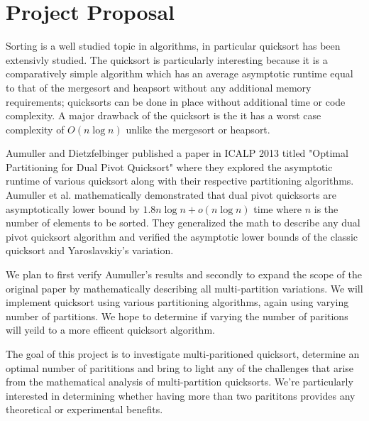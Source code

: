 \documentclass[12pt]{report}
\begin{document}
	\section{Project Proposal}
	
	Sorting is a well studied topic in algorithms, in particular quicksort has been extensivly studied. The quicksort is particularly interesting because it is a comparatively simple algorithm which has an average asymptotic runtime equal to that of the mergesort and heapsort without any additional memory requirements; quicksorts can be done in place without additional time or code complexity. A major drawback of the quicksort is the it has a worst case complexity of $O(n\log n)$ unlike the mergesort or heapsort.

	Aumuller and Dietzfelbinger published a paper in ICALP 2013 titled "Optimal Partitioning for Dual Pivot Quicksort" where they explored the asymptotic runtime of various quicksort along with their respective partitioning algorithms. Aumuller et al. mathematically demonstrated that dual pivot quicksorts are asymptotically lower bound by $1.8n\log n + o(n\log n)$ time where $n$ is the number of elements to be sorted. They generalized the math to describe any dual pivot quicksort algorithm and verified the asymptotic lower bounds of the classic quicksort and Yaroslavskiy's variation. 

	We plan to first verify Aumuller's results and secondly to expand the scope of the original paper by mathematically describing all multi-partition variations. We will implement quicksort using various partitioning algorithms, again using varying number of partitions. We hope to determine if varying the number of paritions will yeild to a more efficent quicksort algorithm.

	The goal of this project is to investigate multi-paritioned quicksort, determine an optimal number of parititions and bring to light any of the challenges that arise from the mathematical analysis of multi-partition quicksorts. We're particularly interested in determining whether having more than two parititons provides any theoretical or experimental benefits.
\end{document}
